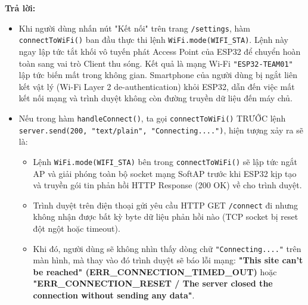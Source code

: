 \begin{tcolorbox}[colback=blue!3,colframe=blue!75!black,title=\textbf{Câu hỏi 2: Sau khi nhấn Kết nối, vì sao điện thoại mất trang web? Bạn sẽ thấy gì trên trình duyệt nếu handleConnect() gọi connectToWiFi() trước server.send()?}]
\textbf{Trả lời:}
\begin{itemize}[leftmargin=*]
    \item Khi người dùng nhấn nút "Kết nối" trên trang \texttt{/settings}, hàm \texttt{connectToWiFi()} ban đầu thực thi lệnh \texttt{WiFi.mode(WIFI\_STA)}. Lệnh này ngay lập tức tắt khối vô tuyến phát Access Point của ESP32 để chuyển hoàn toàn sang vai trò Client thu sóng. Kết quả là mạng Wi-Fi \texttt{"ESP32-TEAM01"} lập tức biến mất trong không gian. Smartphone của người dùng bị ngắt liên kết vật lý (Wi-Fi Layer 2 de-authentication) khỏi ESP32, dẫn đến việc mất kết nối mạng và trình duyệt không còn đường truyền dữ liệu đến máy chủ.
    \item Nếu trong hàm \texttt{handleConnect()}, ta gọi \texttt{connectToWiFi()} TRƯỚC lệnh \texttt{server.send(200, "text/plain", "Connecting....")}, hiện tượng xảy ra sẽ là:
    \begin{itemize}
        \item Lệnh \texttt{WiFi.mode(WIFI\_STA)} bên trong \texttt{connectToWiFi()} sẽ lập tức ngắt AP và giải phóng toàn bộ socket mạng SoftAP trước khi ESP32 kịp tạo và truyền gói tin phản hồi HTTP Response (200 OK) về cho trình duyệt.
        \item Trình duyệt trên điện thoại gửi yêu cầu HTTP GET \texttt{/connect} đi nhưng không nhận được bất kỳ byte dữ liệu phản hồi nào (TCP socket bị reset đột ngột hoặc timeout).
        \item Khi đó, người dùng sẽ không nhìn thấy dòng chữ \texttt{"Connecting...."} trên màn hình, mà thay vào đó trình duyệt sẽ báo lỗi mạng: \textbf{"This site can't be reached" (ERR\_CONNECTION\_TIMED\_OUT)} hoặc \textbf{"ERR\_CONNECTION\_RESET / The server closed the connection without sending any data"}.
    \end{itemize}
\end{itemize}
\end{tcolorbox}

\newpage

